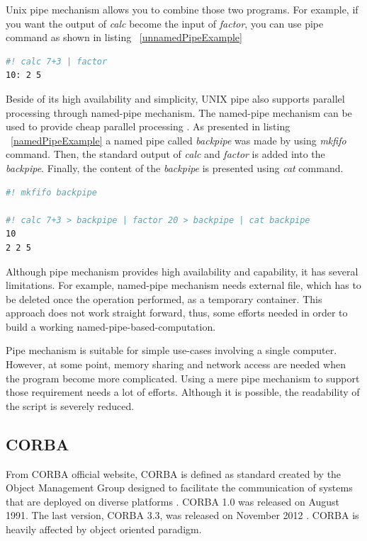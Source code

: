 \documentclass[conference]{IEEEtran}
\begin{document}
Unix pipe mechanism allows you to combine those two programs. For example, if you
want the output of {\it calc} become the input of {\it factor}, you can use pipe
command as shown in listing ~\ref{unnamedPipeExample}

\begin{lstlisting}[caption=Unnamed pipe example, label=unnamedPipeExample, language=bash, basicstyle=\small, breaklines=true]
#! calc 7+3 | factor
10: 2 5
\end{lstlisting}

Beside of its high availability and simplicity, UNIX pipe also supports parallel
processing through named-pipe mechanism. The named-pipe mechanism can be used to 
provide cheap parallel processing \cite{conway2003parallel}. As presented in 
listing ~\ref{namedPipeExample} a named pipe called {\it backpipe} was made by using {\it mkfifo} command. 
Then, the standard output of {\it calc} and {\it factor} is added into the {\it backpipe}. Finally, the content of the {\it backpipe} is presented using {\it cat} command.

\begin{lstlisting}[caption=Named pipe example, label=namedPipeExample, language=bash, basicstyle=\small, breaklines=true]
#! mkfifo backpipe 

#! calc 7+3 > backpipe | factor 20 > backpipe | cat backpipe
10
2 2 5
\end{lstlisting}

Although pipe mechanism provides high availability and capability, 
it has several limitations. For example, named-pipe mechanism needs external file, which has to be deleted once the operation performed, as a temporary container. This approach does not work straight forward, thus, some efforts needed in order to 
build a working named-pipe-based-computation. 

Pipe mechanism is suitable for simple use-cases involving a single computer. 
However, at some point, memory sharing  and network access are needed when the program become more complicated. 
Using a mere pipe mechanism to support those requirement needs a lot of 
efforts. Although it is possible, the readability of the script is severely reduced.


\subsection{CORBA}

From CORBA official website, CORBA is defined as standard created by the Object 
Management Group designed to facilitate the communication of systems 
that are deployed on diverse platforms \cite{corba}. CORBA 1.0 was released on August 
1991. The last version, CORBA 3.3, was released on November 2012 \cite{corbaspec}.
CORBA is heavily affected by object oriented paradigm.
\end{document}
